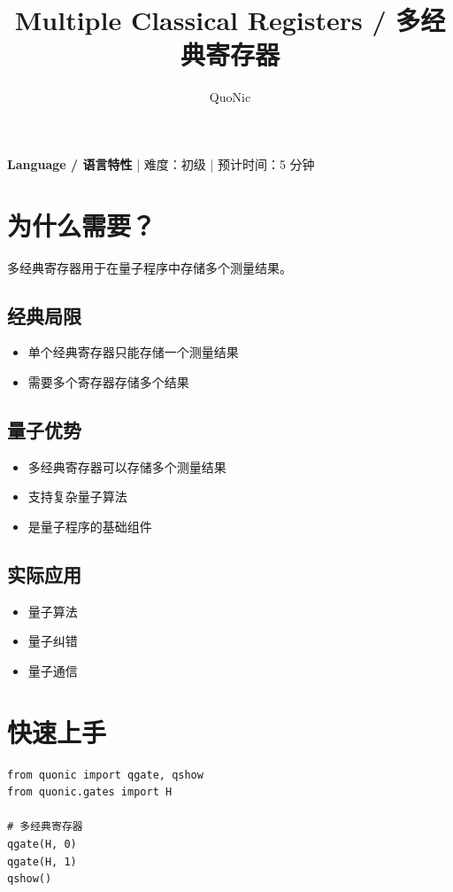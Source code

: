 \documentclass[12pt,a4paper]{article}
\title{Multiple Classical Registers / 多经典寄存器}
\author{QuoNic}
\date{}
\begin{document}
\maketitle

\begin{center}
\textbf{Language / 语言特性} | 难度：初级 | 预计时间：5 分钟
\end{center}

\tableofcontents
\newpage

\section{为什么需要？}

多经典寄存器用于在量子程序中存储多个测量结果。

\subsection{经典局限}
\begin{itemize}
  \item 单个经典寄存器只能存储一个测量结果
  \item 需要多个寄存器存储多个结果
\end{itemize}

\subsection{量子优势}
\begin{itemize}
  \item 多经典寄存器可以存储多个测量结果
  \item 支持复杂量子算法
  \item 是量子程序的基础组件
\end{itemize}

\subsection{实际应用}
\begin{itemize}
  \item 量子算法
  \item 量子纠错
  \item 量子通信
\end{itemize}

\section{快速上手}

\begin{verbatim}
from quonic import qgate, qshow
from quonic.gates import H

# 多经典寄存器
qgate(H, 0)
qgate(H, 1)
qshow()
\end{verbatim}
\end{document}
